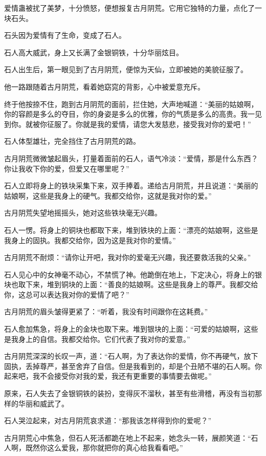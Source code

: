 \begin{this_body}
爱情蛊被扰了美梦，十分愤怒，便想报复古月阴荒。它用它独特的力量，点化了一块石头。

石头因为爱情有了生命，变成了石人。

石人高大威武，身上又长满了金银铜铁，十分华丽炫目。

石人出生后，第一眼见到了古月阴荒，便惊为天仙，立即被她的美貌征服了。

他一路跟随着古月阴荒，看着她窈窕的背影，心中被爱意充斥。

终于他按捺不住，跑到古月阴荒的面前，拦住她，大声地喊道：“美丽的姑娘啊，你的容颜是多么的夺目，你的身姿是多么的优雅，你的气质是多么的高贵。我一见到你。就被你征服了。你就是我的爱情，请您大发慈悲，接受我对你的爱吧！”

石人体型雄壮，完全挡住了古月阴荒的路。

古月阴荒微微皱起眉头，打量着面前的石人，语气冷淡：“爱情，那是什么东西？你让我收下你的爱，但爱又在哪里呢？”

石人立即将身上的铁块采集下来，双手捧着。递给古月阴荒，并且说道：“美丽的姑娘啊，这些是我身上的硬气。我都交给你，这就是我对你的爱。”

古月阴荒失望地摇摇头，她对这些铁块毫无兴趣。

石人一愣。将身上的铜块也都取下来，堆到铁块的上面：“漂亮的姑娘啊，这些是我身上的固执。我都交给你，因为这是我对你的爱情。”

古月阴荒不耐烦：“请你让开吧，我对你的爱毫无兴趣，我还要救活我的父亲。”

石人见心中的女神毫不动心，不禁慌了神。他跪倒在地上，下定决心，将身上的银块也取下来，堆到铜块的上面：“善良的姑娘啊。这些是我身上的尊严。我都交给你，这总可以表达我对你的爱情了吧？”

古月阴荒的眉头皱得更紧了：“听着，我没有时间跟你在这耗费。”

石人愈加焦急，将身上的金块也取下来。堆到银块的上面：“可爱的姑娘啊，这些是我身上的自信。我都交给你。它们代表了我对你的爱意。”

古月阴荒深深的长叹一声，道：“石人啊，为了表达你的爱情，你不再硬气，放下固执，丢掉尊严，甚至舍弃了自信。但是我看到的，却是个丑陋不堪的石人啊。你起来吧，我不会接受你对我的爱，我还有更重要的事情要去做呢。”

原来，石人失去了金银铜铁的装扮，变得灰不溜秋，甚至有些滑稽，再没有当初那样的华丽和威武了。

石人哭泣起来，对古月阴荒哀求道：“那我该怎样得到你的爱呢？”

古月阴荒心中焦急，但石人死活都跪在地上不起来，她念头一转，展颜笑道：“石人啊，既然你这么爱我，那你就把你的真心给我看看吧。”


\end{this_body}
